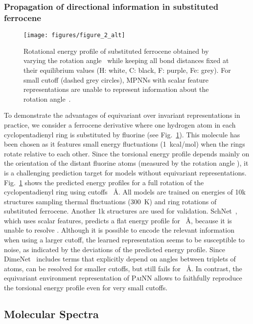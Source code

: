 \documentclass[reprint,
amsmath,amssymb,
 aip,jcp
]{revtex4-2}
\newcommand{\painn}{\textsc{PaiNN}}
\begin{document}
\subsubsection{Propagation of directional information in substituted ferrocene}\label{sec:ferrocene}
\begin{figure}[tb]
\centering
\texttt{[image: figures/figure\_2\_alt]}
\caption{Rotational energy profile of substituted ferrocene obtained by varying the rotation angle~ while keeping all bond distances fixed at their equilibrium values (H: white, C: black, F: purple, Fe: grey). For small cutoff  (dashed grey circles), MPNNs with scalar feature representations are unable to represent information about the rotation angle~.}
\label{fig:ferrocene_rotation}
\end{figure}

To demonstrate the advantages of equivariant over invariant representations in practice, we consider a ferrocene derivative where one hydrogen atom in each cyclopentadienyl ring is substituted by fluorine (see Fig.~\ref{fig:ferrocene_rotation}).
This molecule has been chosen as it features small energy fluctuations (1~kcal/mol) when the rings rotate relative to each other. 
Since the torsional energy profile depends mainly on the orientation of the distant fluorine atoms (measured by the rotation angle ), it is a challenging prediction target for models without equivariant representations.
Fig.~\ref{fig:ferrocene_rotation} shows the predicted energy profiles for a full rotation of the cyclopentadienyl ring using cutoffs ~\AA.
All models are trained on energies of 10k structures sampling thermal fluctuations (300~K) and ring rotations of substituted ferrocene.
Another 1k structures are used for validation.
SchNet~\cite{schutt2017schnet}, which uses scalar features, predicts a flat energy profile for ~\AA, because it is unable to resolve .
Although it is possible to encode the relevant information when using a larger cutoff, the learned representation seems to be susceptible to noise, as indicated by the deviations of the predicted energy profile. 
Since DimeNet~\cite{klicpera2020directional} includes terms that explicitly depend on angles between triplets of atoms,  can be resolved for smaller cutoffs, but still fails for ~\AA.
In contrast, the equivariant environment representation of \painn{} allows to faithfully reproduce the torsional energy profile even for very small cutoffs.  


\subsection{Molecular Spectra}
\end{document}
